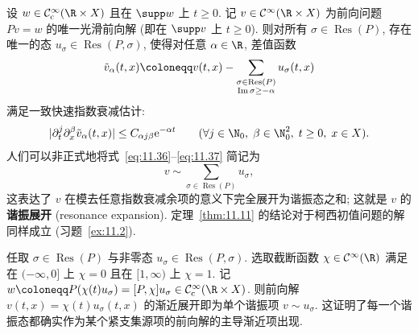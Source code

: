 \begin{theorem}\label{thm:11.11}
设 $w \in \mathcal{C}_{\mathrm{c}}^\infty(\R \times X)$ 且在 $\supp w$ 上 $t \ge 0$. 记 $v \in \mathcal{C}^\infty(\R \times X)$ 为前向问题 $P v = w$ 的唯一光滑前向解 (即在 $\supp v$ 上 $t \ge 0$). 则对所有 $\sigma \in \operatorname{Res}(P)$, 存在唯一的态 $u_\sigma \in \operatorname{Res}(P, \sigma)$, 使得对任意 $\alpha \in \R$, 差值函数
\begin{equation}\label{eq:11.36}
    \tilde v_\alpha(t, x) \defeq v(t, x) - \sum_{\substack{\sigma \in \operatorname{Res}(P) \\ \operatorname{Im}\sigma \ge -\alpha}} u_\sigma(t, x)
\end{equation}
满足一致快速指数衰减估计:
\begin{equation}\label{eq:11.37}
    |\partial_t^j \partial_x^\beta \tilde v_\alpha(t, x)| \le C_{\alpha j \beta} \ee^{-\alpha t} \qquad (\forall j \in \N_0, \; \beta \in \N_0^2, \; t \ge 0, \; x \in X).
\end{equation}
人们可以非正式地将式~\eqref{eq:11.36}--\eqref{eq:11.37} 简记为
\begin{equation}\label{eq:11.38}
    v \sim \sum_{\sigma \in \operatorname{Res}(P)} u_\sigma,
\end{equation}
这表达了 $v$ 在模去任意指数衰减余项的意义下完全展开为谐振态之和; 这就是 $v$ 的\textbf{谐振展开} (resonance expansion). 定理~\ref{thm:11.11} 的结论对于柯西初值问题的解同样成立 (习题~\ref{ex:11.2}).
\end{theorem}

\begin{remark}[全体谐振态均非平凡出现]\label{rem:11.12}
任取 $\sigma \in \operatorname{Res}(P)$ 与非零态 $u_\sigma \in \operatorname{Res}(P, \sigma)$. 选取截断函数 $\chi \in \mathcal{C}^\infty(\R)$ 满足在 $(-\infty, 0]$ 上 $\chi = 0$ 且在 $[1, \infty)$ 上 $\chi = 1$. 记 $w \defeq P(\chi(t) u_\sigma) = [P, \chi] u_\sigma \in \mathcal{C}_{\mathrm{c}}^\infty(\R \times X)$. 则前向解 $v(t, x) = \chi(t) u_\sigma(t, x)$ 的渐近展开即为单个谐振项 $v \sim u_\sigma$. 这证明了每一个谐振态都确实作为某个紧支集源项的前向解的主导渐近项出现.
\end{remark}

